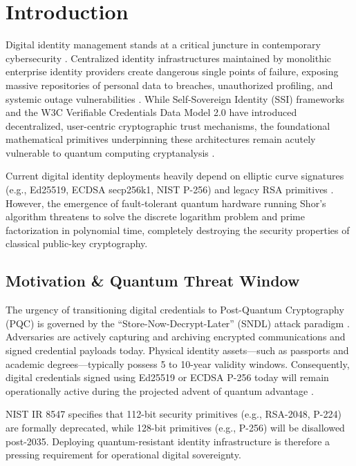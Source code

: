 \documentclass[5p,times,authoryear]{elsarticle}
\begin{document}
\section{Introduction}
Digital identity management stands at a critical juncture in contemporary cybersecurity \cite{allen2016path, krul2024sok}. Centralized identity infrastructures maintained by monolithic enterprise identity providers create dangerous single points of failure, exposing massive repositories of personal data to breaches, unauthorized profiling, and systemic outage vulnerabilities \cite{malik2023developing, ormeir2019dynamic}. While Self-Sovereign Identity (SSI) frameworks and the W3C Verifiable Credentials Data Model 2.0 \cite{w3cvc2024} have introduced decentralized, user-centric cryptographic trust mechanisms, the foundational mathematical primitives underpinning these architectures remain acutely vulnerable to quantum computing cryptanalysis \cite{shor1997polynomial, grover1996fast}.

Current digital identity deployments heavily depend on elliptic curve signatures (e.g., Ed25519, ECDSA secp256k1, NIST P-256) and legacy RSA primitives \cite{w3cvc2024}. However, the emergence of fault-tolerant quantum hardware running Shor's algorithm \cite{shor1997polynomial} threatens to solve the discrete logarithm problem and prime factorization in polynomial time, completely destroying the security properties of classical public-key cryptography.

\subsection{Motivation \& Quantum Threat Window}
The urgency of transitioning digital credentials to Post-Quantum Cryptography (PQC) is governed by the ``Store-Now-Decrypt-Later'' (SNDL) attack paradigm \cite{mosca2018cybersecurity}. Adversaries are actively capturing and archiving encrypted communications and signed credential payloads today. Physical identity assets---such as passports and academic degrees---typically possess 5 to 10-year validity windows. Consequently, digital credentials signed using Ed25519 or ECDSA P-256 today will remain operationally active during the projected advent of quantum advantage \cite{ibm2023quantum, nistir8547}.

NIST IR 8547 \cite{nistir8547} specifies that 112-bit security primitives (e.g., RSA-2048, P-224) are formally deprecated, while 128-bit primitives (e.g., P-256) will be disallowed post-2035. Deploying quantum-resistant identity infrastructure is therefore a pressing requirement for operational digital sovereignty.
\end{document}
